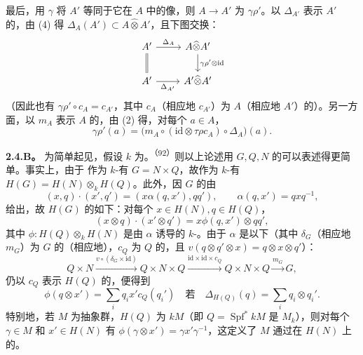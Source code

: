 最后，用 $\gamma$ 将 $A'$ 等同于它在 $A$ 中的像，则 $A\to A'$ 为 $\gamma\rho'$。以 $\Delta_{A'}$ 表示 $A'$ 的，由 (4) 得 $\Delta_A(A')\subset A\widehat\otimes A'$，且下图交换：
\[
\begin{tikzcd}
A'\arrow[r,"\Delta_A"]\arrow[d,equal]&A\widehat\otimes A'\arrow[d,"\gamma\rho'\otimes\mathrm{id}"]\\
A'\arrow[r,"\Delta_{A'}"']&A'\widehat\otimes A'
\end{tikzcd}
\]
（因此也有 $\gamma\rho'\circ c_A=c_{A'}$，其中 $c_A$（相应地 $c_{A'}$）为 $A$（相应地 $A'$）的）。另一方面，以 $m_A$ 表示 $A$ 的，由 (2) 得，对每个 $a\in A$，
\[
\gamma\rho'(a)=\bigl(m_A\circ(\mathrm{id}\otimes\tau\rho c_A)\circ\Delta_A\bigr)(a).
\]

\textbf{2.4.B。} 为简单起见，假设 $k$ 为。\textsuperscript{（92）}则以上论述用 $G,Q,N$ 的可以表述得更简单。事实上，由于
作为 $k$-有 $G=N\times Q$，故作为 $k$-有 $H(G)=H(N)\otimes_k H(Q)$。此外，因 $G$ 的由
\[
(x,q)\cdot(x',q')=(x\alpha(q,x'),qq'),\qquad\alpha(q,x')=qxq^{-1},
\]
给出，故 $H(G)$ 的如下：对每个 $x\in H(N),q\in H(Q)$，
\[
(x\otimes q)\cdot(x'\otimes q')=x\phi(q,x')\otimes qq',
\]
其中 $\phi:H(Q)\otimes_k H(N)$ 是由 $\alpha$ 诱导的 $k$-。由于 $\alpha$ 是以下（其中 $\delta_G$（相应地 $m_G$）为 $G$ 的（相应地），$c_Q$ 为 $Q$ 的，且 $v(q\otimes q'\otimes x)=q\otimes x\otimes q'$）：
\[
Q\times N\xrightarrow{v\circ(\delta_G\times\mathrm{id})}Q\times N\times Q
\xrightarrow{\mathrm{id}\times\mathrm{id}\times c_Q}Q\times N\times Q\xrightarrow{m_G}G,
\]
仍以 $c_Q$ 表示 $H(Q)$ 的，便得到
\[
\phi(q\otimes x')=\sum_iq_ix'c_Q(q_i')\quad\text{若}\quad\Delta_{H(Q)}(q)=\sum_iq_i\otimes q_i'.\tag{$\star$}
\]
特别地，若 $M$ 为抽象群，$H(Q)$ 为 $kM$（即 $Q=\operatorname{Spf}^*kM$ 是 $M_k$），则对每个 $\gamma\in M$ 和 $x'\in H(N)$ 有 $\phi(\gamma\otimes x')=\gamma x'\gamma^{-1}$，这定义了 $M$ 通过在 $H(N)$ 上的。

